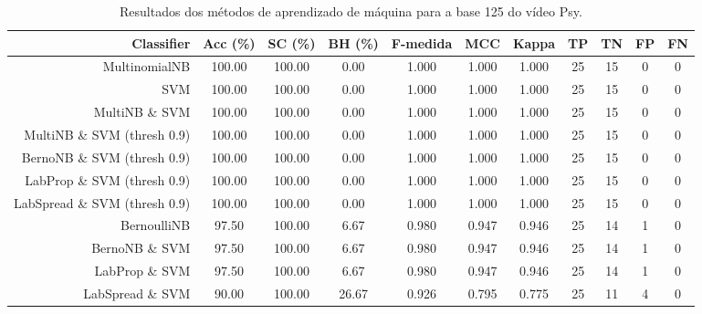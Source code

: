 \begin{table}[!htb]
\centering
\caption{Resultados dos métodos de aprendizado de máquina para a base 125 do vídeo Psy.}
\label{tab:Psy-125}
\begin{tabular}{r|c|c|c|c|c|c|c|c|c|c}
\hline\hline
Classifier & Acc (\%) & SC (\%) & BH (\%) & F-medida & MCC & Kappa & TP & TN & FP & FN \\ \hline
MultinomialNB & 100.00 & 100.00 & 0.00 & 1.000 & 1.000 & 1.000 & 25 & 15 & 0 & 0 \\ 
SVM & 100.00 & 100.00 & 0.00 & 1.000 & 1.000 & 1.000 & 25 & 15 & 0 & 0 \\ 
MultiNB \& SVM & 100.00 & 100.00 & 0.00 & 1.000 & 1.000 & 1.000 & 25 & 15 & 0 & 0 \\ 
MultiNB \& SVM (thresh 0.9) & 100.00 & 100.00 & 0.00 & 1.000 & 1.000 & 1.000 & 25 & 15 & 0 & 0 \\ 
BernoNB \& SVM (thresh 0.9) & 100.00 & 100.00 & 0.00 & 1.000 & 1.000 & 1.000 & 25 & 15 & 0 & 0 \\ 
LabProp \& SVM (thresh 0.9) & 100.00 & 100.00 & 0.00 & 1.000 & 1.000 & 1.000 & 25 & 15 & 0 & 0 \\ 
LabSpread \& SVM (thresh 0.9) & 100.00 & 100.00 & 0.00 & 1.000 & 1.000 & 1.000 & 25 & 15 & 0 & 0 \\ 
BernoulliNB & 97.50 & 100.00 & 6.67 & 0.980 & 0.947 & 0.946 & 25 & 14 & 1 & 0 \\ 
BernoNB \& SVM & 97.50 & 100.00 & 6.67 & 0.980 & 0.947 & 0.946 & 25 & 14 & 1 & 0 \\ 
LabProp \& SVM & 97.50 & 100.00 & 6.67 & 0.980 & 0.947 & 0.946 & 25 & 14 & 1 & 0 \\ 
LabSpread \& SVM & 90.00 & 100.00 & 26.67 & 0.926 & 0.795 & 0.775 & 25 & 11 & 4 & 0 \\ 
\hline\hline
\end{tabular}
\end{table}

